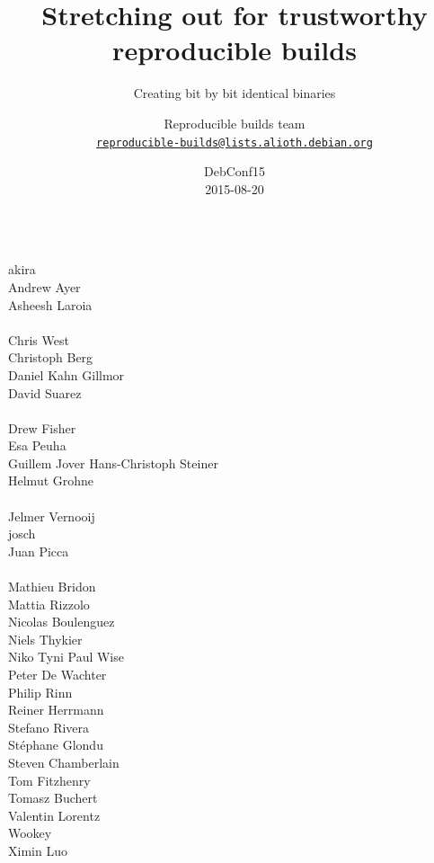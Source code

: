 \documentclass[14pt]{beamer}
\title[Reproducible builds]{Stretching out for trustworthy reproducible builds}
\subtitle{Creating bit by bit identical binaries}
\author[Reproducible builds team]{%
   \texorpdfstring{
        Reproducible builds team\\
        \href{mailto:reproducible-builds@lists.alioth.debian.org}{\texttt{reproducible-builds@lists.alioth.debian.org}}
   }{Reproducible builds team}}
\institute[Debian]{}
\date[DebConf15]{%
 DebConf15\\
 \small
 2015-08-20}
\begin{document}
\begin{frame}
 \titlepage
\end{frame}

\begin{frame}
 \begin{center}
  \begin{columns}
   \small
    akira \\
    Andrew Ayer \\
    Asheesh Laroia \\
     \\
    Chris West \\
    Christoph Berg \\
    Daniel Kahn Gillmor \\
    David Suarez \\
     \\
    Drew Fisher \\
    Esa Peuha \\
    Guillem Jover
    Hans-Christoph Steiner \\
    Helmut Grohne \\
     \\
    Jelmer Vernooij \\
    josch \\
    Juan Picca \\
     \\
    Mathieu Bridon \\
    Mattia Rizzolo \\
    Nicolas Boulenguez \\
    Niels Thykier \\
    Niko Tyni
    Paul Wise \\
    Peter De Wachter \\
    Philip Rinn \\
    Reiner Herrmann \\
    Stefano Rivera \\
    Stéphane Glondu \\
    Steven Chamberlain \\
    Tom Fitzhenry \\
    Tomasz Buchert \\
    Valentin Lorentz \\
    Wookey \\
    Ximin Luo
  \end{columns}
 \end{center}
\end{frame}
\end{document}
